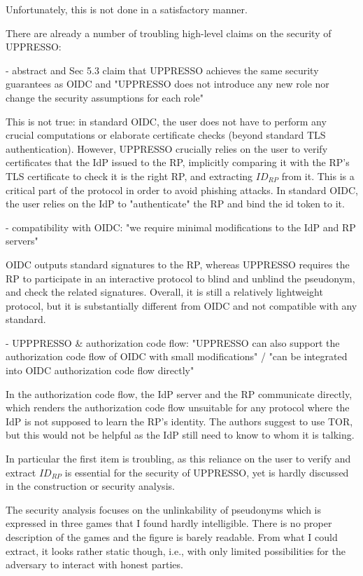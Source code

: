 \documentclass[letterpaper,onecolumn,10pt]{article}
\begin{document}
Unfortunately, this is not done in a satisfactory manner.

There are already a number of troubling high-level claims on the security of UPPRESSO:

- abstract and Sec 5.3 claim that UPPRESSO achieves the same security guarantees as OIDC and "UPPRESSO does not introduce any new role nor change the security assumptions for each role"

This is not true: in standard OIDC, the user does not have to perform any crucial computations or elaborate certificate checks (beyond standard TLS authentication). However, UPPRESSO crucially relies on the user to verify certificates that the IdP issued to the RP, implicitly comparing it with the RP's TLS certificate to check it is the right RP, and extracting $ID_{RP}$ from it. This is a critical part of the protocol in order to avoid phishing attacks. In standard OIDC, the user relies on the IdP to "authenticate" the RP and bind the id token to it.

- compatibility with OIDC: "we require minimal modifications to the IdP and RP servers"

OIDC outputs standard signatures to the RP, whereas UPPRESSO requires the RP to participate in an interactive protocol to blind and unblind the pseudonym, and check the related signatures. Overall, it is still a relatively lightweight protocol, but it is substantially different from OIDC and not compatible with any standard.

- UPPPRESSO \& authorization code flow: "UPPRESSO can also support the authorization code flow of
OIDC with small modifications" / "can be integrated into OIDC authorization code flow directly"

In the authorization code flow, the IdP server and the RP communicate directly, which renders the authorization code flow unsuitable for any protocol where the IdP is not supposed to learn the RP's identity. The authors suggest to use TOR, but this would not be helpful as the IdP still need to know to whom it is talking.


In particular the first item is troubling, as this reliance on the user to verify and extract $ID_{RP}$ is essential for the security of UPPRESSO, yet is hardly discussed in the construction or security analysis.

The security analysis focuses on the unlinkability of pseudonyms which is expressed in three games that I found hardly intelligible. There is no proper description of the games and the figure is barely readable. From what I could extract, it looks rather static though, i.e., with only limited possibilities for the adversary to interact with honest parties.
\end{document}
